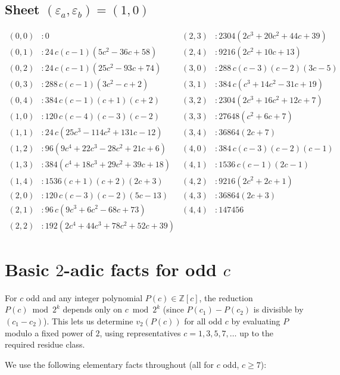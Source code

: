 \documentclass[11pt]{article}
\begin{document}
\subsection{Sheet $(\varepsilon_a, \varepsilon_b) = (1,0)$}

\begin{small}
\begin{align*}
(0,0)&: 0 & (2,3)&: 2304(2c^3 + 20c^2 + 44c + 39) \\
(0,1)&: 24\,c(c{-}1)(5c^2 - 36c + 58) & (2,4)&: 9216(2c^2 + 10c + 13) \\
(0,2)&: 24\,c(c{-}1)(25c^2 - 93c + 74) & (3,0)&: 288\,c(c{-}3)(c{-}2)(3c - 5) \\
(0,3)&: 288\,c(c{-}1)(3c^2 - c + 2) & (3,1)&: 384\,c(c^3 + 14c^2 - 31c + 19) \\
(0,4)&: 384\,c(c{-}1)(c{+}1)(c{+}2) & (3,2)&: 2304(2c^3 + 16c^2 + 12c + 7) \\
(1,0)&: 120\,c(c{-}4)(c{-}3)(c{-}2) & (3,3)&: 27648(c^2 + 6c + 7) \\
(1,1)&: 24\,c(25c^3 - 114c^2 + 131c - 12) & (3,4)&: 36864(2c + 7) \\
(1,2)&: 96(9c^4 + 22c^3 - 28c^2 + 21c + 6) & (4,0)&: 384\,c(c{-}3)(c{-}2)(c{-}1) \\
(1,3)&: 384(c^4 + 18c^3 + 29c^2 + 39c + 18) & (4,1)&: 1536\,c(c{-}1)(2c - 1) \\
(1,4)&: 1536(c{+}1)(c{+}2)(2c + 3) & (4,2)&: 9216(2c^2 + 2c + 1) \\
(2,0)&: 120\,c(c{-}3)(c{-}2)(5c - 13) & (4,3)&: 36864(2c + 3) \\
(2,1)&: 96\,c(9c^3 + 6c^2 - 68c + 73) & (4,4)&: 147456 \\
(2,2)&: 192(2c^4 + 44c^3 + 78c^2 + 52c + 39) & &
\end{align*}
\end{small}

\section{Basic $2$-adic facts for odd $c$}\label{sec:facts}

For $c$ odd and any integer polynomial $P(c) \in \mathbb{Z}[c]$, the reduction
$P(c) \bmod 2^k$ depends only on $c \bmod 2^k$ (since $P(c_1) - P(c_2)$ is
divisible by $(c_1 - c_2)$). This lets us determine $v_2(P(c))$ for all odd $c$
by evaluating $P$ modulo a fixed power of $2$, using representatives $c = 1, 3,
5, 7, \ldots$ up to the required residue class.

We use the following elementary facts throughout (all for $c$ odd,
$c \ge 7$):
\end{document}
